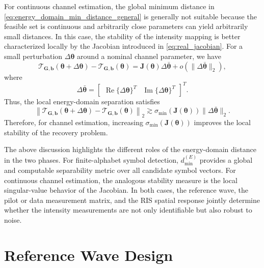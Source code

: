 \documentclass[journal]{IEEEtran}
\begin{document}
For continuous channel estimation, the global minimum distance in \eqref{eq:energy_domain_min_distance_general} is generally not suitable because the feasible set is continuous and arbitrarily close parameters can yield arbitrarily small distances. 
In this case, the stability of the intensity mapping is better characterized locally by the Jacobian introduced in \eqref{eq:real_jacobian}. 
For a small perturbation $\Delta\boldsymbol{\theta}$ around a nominal channel parameter, we have
\begin{equation}
\mathcal{T}_{\mathbf{G},\mathbf{b}}(\boldsymbol{\theta}+\Delta\boldsymbol{\theta})
-
\mathcal{T}_{\mathbf{G},\mathbf{b}}(\boldsymbol{\theta})
=
\mathbf{J}(\boldsymbol{\theta})
\Delta\bar{\boldsymbol{\theta}}
+
o(\|\Delta\bar{\boldsymbol{\theta}}\|_2),
\label{eq:local_energy_distance_jacobian}
\end{equation}
where
\begin{equation}
\Delta\bar{\boldsymbol{\theta}}
=
\begin{bmatrix}
\operatorname{Re}\{\Delta\boldsymbol{\theta}\}^T &
\operatorname{Im}\{\Delta\boldsymbol{\theta}\}^T
\end{bmatrix}^T.
\end{equation}
Thus, the local energy-domain separation satisfies
\begin{equation}
\left\|
\mathcal{T}_{\mathbf{G},\mathbf{b}}(\boldsymbol{\theta}+\Delta\boldsymbol{\theta})
-
\mathcal{T}_{\mathbf{G},\mathbf{b}}(\boldsymbol{\theta})
\right\|_2
\gtrsim
\sigma_{\min}(\mathbf{J}(\boldsymbol{\theta}))
\|\Delta\bar{\boldsymbol{\theta}}\|_2.
\label{eq:local_stability_jacobian}
\end{equation}
Therefore, for channel estimation, increasing $\sigma_{\min}(\mathbf{J}(\boldsymbol{\theta}))$ improves the local stability of the recovery problem.

The above discussion highlights the different roles of the energy-domain distance in the two phases. 
For finite-alphabet symbol detection, $d_{\min}^{(E)}$ provides a global and computable separability metric over all candidate symbol vectors. 
For continuous channel estimation, the analogous stability measure is the local singular-value behavior of the Jacobian. 
In both cases, the reference wave, the pilot or data measurement matrix, and the RIS spatial response jointly determine whether the intensity measurements are not only identifiable but also robust to noise.


\section{Reference Wave Design}
\end{document}
